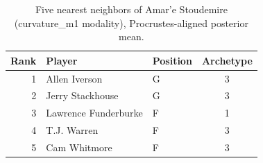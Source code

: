 \begin{table}[htbp]
  \centering\small
  \begin{tabular}{rllc}
    \toprule
    Rank & Player & Position & Archetype \\
    \midrule
    1 & Allen Iverson & G & 3 \\
    2 & Jerry Stackhouse & G & 3 \\
    3 & Lawrence Funderburke & F & 1 \\
    4 & T.J. Warren & F & 3 \\
    5 & Cam Whitmore & F & 3 \\
    \bottomrule
  \end{tabular}
  \caption{Five nearest neighbors of Amar'e Stoudemire (curvature_m1 modality), Procrustes-aligned posterior mean.}
  \label{tab:Amar_e_Stoudemire_neighbors_curvature_m1}
\end{table}

